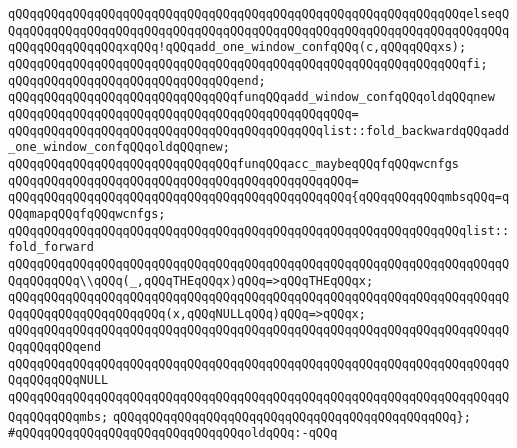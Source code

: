 \verb|qQQqqQQqqQQqqQQqqQQqqQQqqQQqqQQqqQQqqQQqqQQqqQQqqQQqqQQqqQQqqQQqelseqQQqqQQqqQQqqQQqqQQqqQQqqQQqqQQqqQQqqQQqqQQqqQQqqQQqqQQqqQQqqQQqqQQqqQQqqQQqqQQqqQQqqQQqxqQQq!qQQqadd_one_window_confqQQq(c,qQQqqQQqxs);|\newline
\verb|qQQqqQQqqQQqqQQqqQQqqQQqqQQqqQQqqQQqqQQqqQQqqQQqqQQqqQQqqQQqqQQqfi;|\newline
\verb|qQQqqQQqqQQqqQQqqQQqqQQqqQQqqQQqend;|\newline
\newline
\verb|qQQqqQQqqQQqqQQqqQQqqQQqqQQqqQQqfunqQQqadd_window_confqQQqoldqQQqnew|\newline
\verb|qQQqqQQqqQQqqQQqqQQqqQQqqQQqqQQqqQQqqQQqqQQqqQQq=|\newline
\verb|qQQqqQQqqQQqqQQqqQQqqQQqqQQqqQQqqQQqqQQqqQQqlist::fold_backwardqQQqadd_one_window_confqQQqoldqQQqnew;|\newline
\newline
\newline
\newline
\verb|qQQqqQQqqQQqqQQqqQQqqQQqqQQqqQQqfunqQQqacc_maybeqQQqfqQQqwcnfgs|\newline
\verb|qQQqqQQqqQQqqQQqqQQqqQQqqQQqqQQqqQQqqQQqqQQqqQQq=|\newline
\verb|qQQqqQQqqQQqqQQqqQQqqQQqqQQqqQQqqQQqqQQqqQQqqQQq{qQQqqQQqqQQqmbsqQQq=qQQqmapqQQqfqQQqwcnfgs;|\newline
\newline
\verb|qQQqqQQqqQQqqQQqqQQqqQQqqQQqqQQqqQQqqQQqqQQqqQQqqQQqqQQqqQQqqQQqlist::fold_forward|\newline
\verb|qQQqqQQqqQQqqQQqqQQqqQQqqQQqqQQqqQQqqQQqqQQqqQQqqQQqqQQqqQQqqQQqqQQqqQQqqQQqqQQq\\qQQq(_,qQQqTHEqQQqx)qQQq=>qQQqTHEqQQqx;|\newline
\verb|qQQqqQQqqQQqqQQqqQQqqQQqqQQqqQQqqQQqqQQqqQQqqQQqqQQqqQQqqQQqqQQqqQQqqQQqqQQqqQQqqQQqqQQqqQQq(x,qQQqNULLqQQq)qQQq=>qQQqx;|\newline
\verb|qQQqqQQqqQQqqQQqqQQqqQQqqQQqqQQqqQQqqQQqqQQqqQQqqQQqqQQqqQQqqQQqqQQqqQQqqQQqqQQqend|\newline
\verb|qQQqqQQqqQQqqQQqqQQqqQQqqQQqqQQqqQQqqQQqqQQqqQQqqQQqqQQqqQQqqQQqqQQqqQQqqQQqqQQqNULL|\newline
\verb|qQQqqQQqqQQqqQQqqQQqqQQqqQQqqQQqqQQqqQQqqQQqqQQqqQQqqQQqqQQqqQQqqQQqqQQqqQQqqQQqmbs;|\newline
\verb|qQQqqQQqqQQqqQQqqQQqqQQqqQQqqQQqqQQqqQQqqQQqqQQq};|\newline
\newline
\verb|#qQQqqQQqqQQqqQQqqQQqqQQqqQQqqQQqoldqQQq:-qQQq|\newline
